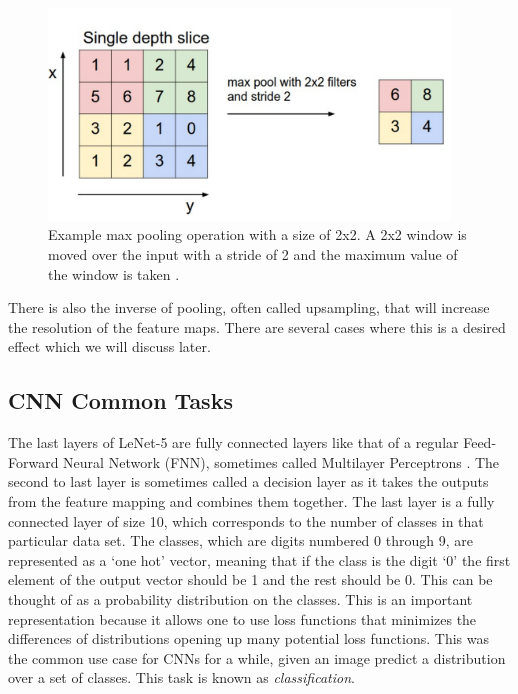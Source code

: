 \begin{figure}[h!]
	\centering
		\includegraphics[width=0.95\textwidth]{figures/maxpool.png}
	\caption{Example max pooling operation with a size of 2x2. A 2x2 window is moved over the input with a stride of 2 and the maximum value of the window is taken \cite{maxpooling}.}
	\label{f:maxpool}
\end{figure}

There is also the inverse of pooling, often called upsampling, that will increase the resolution of the feature maps.
There are several cases where this is a desired effect which we will discuss later.


\subsection{CNN Common Tasks}
The last layers of LeNet-5 are fully connected layers like that of a regular Feed-Forward Neural Network (FNN), sometimes called Multilayer Perceptrons \cite{rumelhart1985learning}. 
The second to last layer is sometimes called a decision layer as it takes the outputs from the feature mapping and combines them together. 
The last layer is a fully connected layer of size 10, which corresponds to the number of classes in that particular data set. 
The classes, which are digits numbered 0 through 9, are represented as a `one hot' vector, meaning that if the class is the digit `0' the first element of the output vector should be 1 and the rest should be 0. 
This can be thought of as a probability distribution on the classes. 
This is an important representation because it allows one to use loss functions that minimizes the differences of distributions opening up many potential loss functions.
This was the common use case for CNNs for a while, given an image predict a distribution over a set of classes. 
This task is known as \textit{classification}. 

